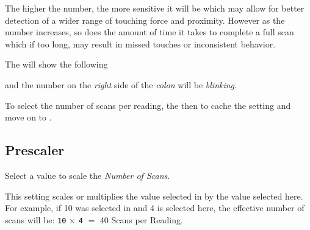 \par\medskip

The higher the number, the more sensitive it will be which may allow for better
detection of a wider range of touching force and proximity.  However as the
number increases, so does the amount of time it takes to complete a full scan
which if too long, may result in missed touches or inconsistent behavior.

\par\medskip


\par\medskip

The  will show the following


and the number on the \textit{right} side of the \textit{colon} will be
\textit{blinking}.

\par\medskip

To select the number of scans per reading,  the  then 
to cache the setting and move on to .


\subsection{Prescaler} 

Select a value to scale the \textit{Number of Scans}.

\par\medskip

This setting scales or multiplies the value selected in  by the value
selected here.  For example, if \num{10} was selected in  and \num{4}
is selected here, the effective number of scans will be:
\texttt{10} \textbf{$\times$} \texttt{4} $=$ \num{40} Scans per Reading.

